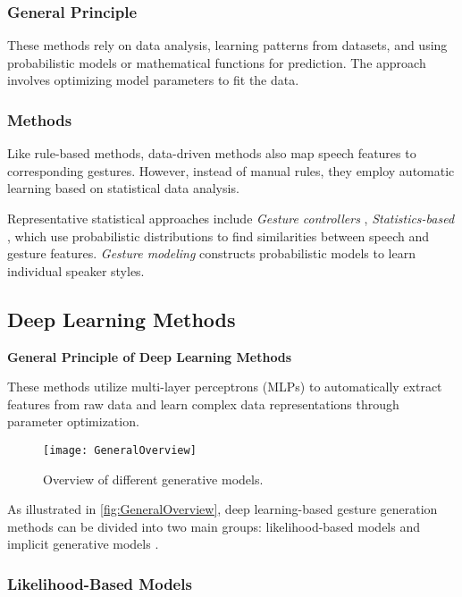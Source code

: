 \subsubsection{General Principle}

These methods rely on data analysis, learning patterns from datasets, and using probabilistic models or mathematical functions for prediction. The approach involves optimizing model parameters to fit the data.

\subsubsection{Methods}

Like rule-based methods, data-driven methods also map speech features to corresponding gestures. However, instead of manual rules, they employ automatic learning based on statistical data analysis.

Representative statistical approaches include \textit{Gesture controllers} \cite{levine2010gesture}, \textit{Statistics-based} \cite{yang2020statistics}, which use probabilistic distributions to find similarities between speech and gesture features. \textit{Gesture modeling} \cite{neff2008gesture} constructs probabilistic models to learn individual speaker styles.

\subsection{Deep Learning Methods}

\textbf{General Principle of Deep Learning Methods}

These methods utilize multi-layer perceptrons (MLPs) to automatically extract features from raw data and learn complex data representations through parameter optimization.

\begin{figure}[h]
	\centering
	\texttt{[image: GeneralOverview]}
	\caption{Overview of different generative models.}
	\label{fig:GeneralOverview}
\end{figure}

As illustrated in \autoref{fig:GeneralOverview}, deep learning-based gesture generation methods can be divided into two main groups: likelihood-based models and implicit generative models \cite{song2021score}.

\subsubsection{Likelihood-Based Models}

